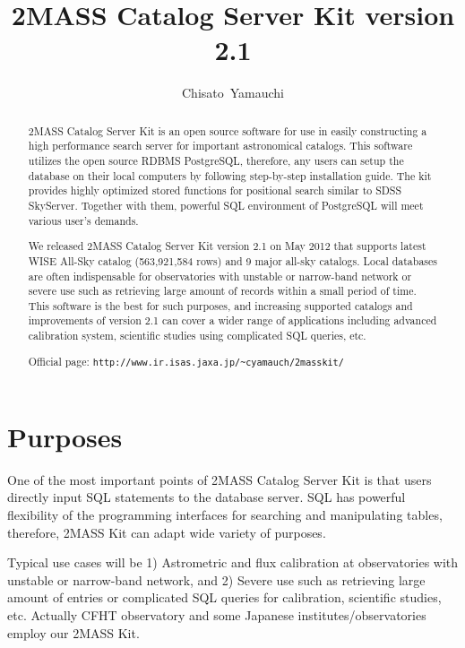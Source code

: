 
\resetcounters




\title{2MASS Catalog Server Kit version 2.1}
\author{Chisato~Yamauchi
}


\begin{abstract}
2MASS Catalog Server Kit is an open source software for use 
in easily constructing a high performance search server for 
important astronomical catalogs. 
This software utilizes the open source RDBMS PostgreSQL, therefore, 
any users can setup the database on their local computers by following
step-by-step installation guide. 
The kit provides highly optimized stored functions for positional search
similar to SDSS SkyServer. 
Together with them, powerful SQL environment of PostgreSQL will meet
various user's demands.

We released 2MASS Catalog Server Kit version 2.1 on May 2012 
that supports latest WISE All-Sky catalog (563,921,584 rows) and 9 
major all-sky catalogs.
Local databases are often indispensable for observatories with 
unstable or narrow-band network or severe use such as
retrieving large amount of records
within a small period of time.
This software is the best for such purposes, and
increasing supported catalogs and improvements of version 2.1 
can cover a wider range of applications including
advanced calibration system, scientific studies
using complicated SQL queries, etc.

Official page: {\tt http://www.ir.isas.jaxa.jp/\~{}cyamauch/2masskit/}
\end{abstract}


\section{Purposes}

One of the most important points of 2MASS Catalog Server Kit 
\citep{yam_2011a} is
that users directly input SQL statements to the database server.
SQL has powerful flexibility of the programming interfaces for searching
and manipulating tables, 
therefore, 2MASS Kit can adapt wide variety of purposes.

Typical use cases will be 
1) Astrometric and flux calibration at observatories with 
unstable or narrow-band network, and
2) Severe use such as retrieving large amount of entries or 
complicated SQL queries for calibration, scientific studies, etc.
Actually CFHT observatory and some Japanese institutes/observatories 
employ our 2MASS Kit. 


